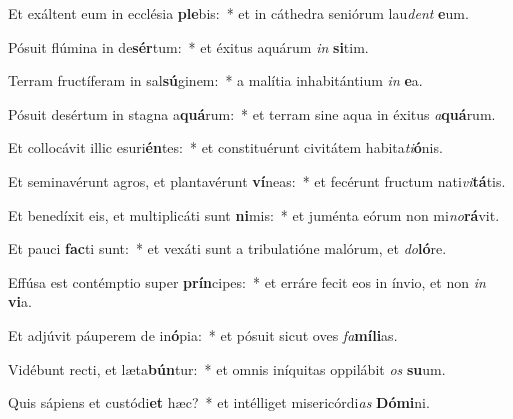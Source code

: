 \item Et exáltent eum in ecclésia \textbf{ple}bis:~* et in cáthedra seniórum lau\textit{dent} \textbf{e}um.
\item Pósuit flúmina in de\textbf{sér}tum:~* et éxitus aquárum \textit{in} \textbf{si}tim.
\item Terram fructíferam in sal\textbf{sú}ginem:~* a malítia inhabitántium \textit{in} \textbf{e}a.
\item Pósuit desértum in stagna a\textbf{quá}rum:~* et terram sine aqua in éxitus \textit{a}\textbf{quá}rum.
\item Et collocávit illic esuri\textbf{én}tes:~* et constituérunt civitátem habita\textit{ti}\textbf{ó}nis.
\item Et seminavérunt agros, et plantavérunt \textbf{ví}neas:~* et fecérunt fructum nati\textit{vi}\textbf{tá}tis.
\item Et benedíxit eis, et multiplicáti sunt \textbf{ni}mis:~* et juménta eórum non mi\textit{no}\textbf{rá}vit.
\item Et pauci \textbf{fac}ti sunt:~* et vexáti sunt a tribulatióne malórum, et \textit{do}\textbf{ló}re.
\item Effúsa est contémptio super \textbf{prín}cipes:~* et erráre fecit eos in ínvio, et non \textit{in} \textbf{vi}a.
\item Et adjúvit páuperem de in\textbf{ó}pia:~* et pósuit sicut oves \textit{fa}\textbf{mí}\textbf{li}as.
\item Vidébunt recti, et læta\textbf{bún}tur:~* et omnis iníquitas oppilábit \textit{os} \textbf{su}um.
\item Quis sápiens et custódi\textbf{et} hæc?~* et intélliget misericórdi\textit{as} \textbf{Dó}\textbf{mi}ni.

